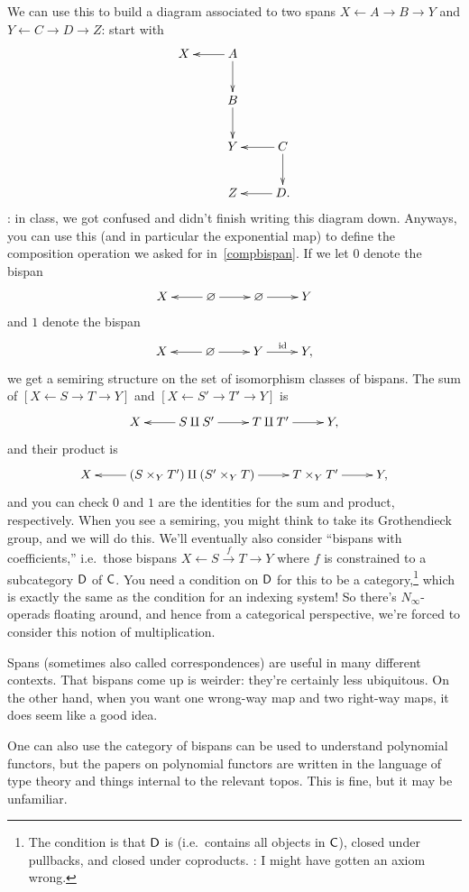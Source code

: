 We can use this to build a diagram associated to two spans $X\gets A\to B\to Y$ and $Y\gets C\to D\to Z$: start
with
\begin{equation}
\label{snake}
\gathxy{
	X & A\ar[l]\ar[d]\\
	& B\ar[d]\\
	& Y & C\ar[l]\ar[d]\\
	& Z & D.\ar[l]
}
\end{equation}
\TODO: in class, we got confused and didn't finish writing this diagram down. Anyways, you can use this (and in
particular the exponential map) to define the composition operation we asked for in~\eqref{compbispan}.
If we let $0$ denote the bispan
\[\xymatrix{
	X & \emptyset\ar[l]\ar[r] & \emptyset\ar[r] & Y
}\]
and $1$ denote the bispan
\[\xymatrix{
	X & \emptyset\ar[l]\ar[r] & Y\ar[r]^\id & Y,
}\]
we get a semiring structure on the set of isomorphism classes of bispans. The sum of $[X\gets S\to T\to Y]$ and
$[X\gets S'\to T'\to Y]$ is
\[\xymatrix{
	X & S\amalg S'\ar[l]\ar[r] & T\amalg T'\ar[r] & Y,
}\]
and their product is
\[\xymatrix{
	X & (S\times_Y T') \amalg (S'\times_Y T)\ar[l]\ar[r] & T\times_Y T'\ar[r] & Y,
}\]
and you can check $0$ and $1$ are the identities for the sum and product, respectively. When you see a semiring,
you might think to take its Grothendieck group, and we will do this. We'll eventually also consider ``bispans with
coefficients,'' i.e.\ those bispans $X\gets S\stackrel f\to T\to Y$ where $f$ is constrained to a subcategory $\mathsf D$
of $\mathsf C$. You need a condition on $\mathsf D$ for this to be a category,\footnote{The condition is that $\mathsf D$ is
 (i.e.\ contains all objects in $\mathsf C$), closed under pullbacks, and closed under
coproducts. \TODO: I might have gotten an axiom wrong.} which is exactly the same as the condition for an indexing
system! So there's $N_\infty$-operads floating around, and hence from a categorical perspective, we're forced to
consider this notion of multiplication.

\begin{rem}
Spans (sometimes also called correspondences) are useful in many different contexts. That bispans come up is
weirder: they're certainly less ubiquitous. On the other hand, when you want one wrong-way map and two right-way
maps, it does seem like a good idea.
\end{rem}
One can also use the category of bispans can be used to understand polynomial functors, but the papers on
polynomial functors are written in the language of type theory and things internal to the relevant topos. This is
fine, but it may be unfamiliar.

